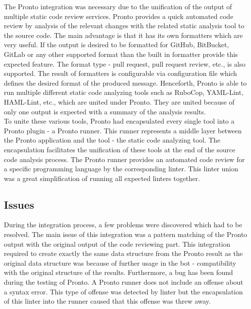 The Pronto \cite{GITHUB-PRONTO} integration was necessary due to the unification of the output of multiple static code review services. Pronto provides a quick automated code review by analysis of the relevant changes with the related static analysis tool to the source code. The main advantage is that it has its own formatters which are very useful. If the output is desired to be formatted for GitHub, BitBucket, GitLab or any other supported format than the built in formatter provide this expected feature. The format type - pull request, pull request review, etc., is also supported. The result of formatters is configurable via configuration file which defines the desired format of the produced message. Henceforth, Pronto is able to run multiple different static code analyzing tools such as RuboCop, YAML-Lint, HAML-Lint, etc., which are united under Pronto. They are united because of only one output is expected with a summary of the analysis results.\\

To unite these various tools, Pronto had encapsulated every single tool into a Pronto plugin - a Pronto runner. This runner represents a middle layer between the Pronto application and the tool - the static code analyzing tool. The encapsulation facilitates the unification of these tools at the end of the source code analysis process. The Pronto runner provides an automated code review for a specific programming language by the corresponding linter. This linter union was a great simplification of running all expected linters together.

\subsection{Issues}

During the integration process, a few problems were discovered which had to be resolved. The main issue of this integration was a pattern matching of the Pronto output with the original output of the code reviewing part. This integration required to create exactly the same data structure from the Pronto result as the original data structure was because of further usage in the bot - compatibility with the original structure of the results. Furthermore, a bug has been found during the testing of Pronto. A Pronto runner does not include an offense about a syntax error. This type of offense was detected by linter but the encapsulation of this linter into the runner caused that this offense was threw away.


